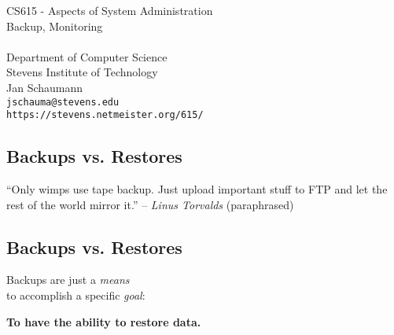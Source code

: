 \documentclass[xga]{xdvislides}
\begin{document}
\setfontphv

\lhead{\slidetitle}                               %
\cfoot{\relax}                               %
\rfoot{\Gray{\today}}

\newcommand{\smallish}{\fontsize{16}{16}\selectfont}

\vspace*{\fill}
\begin{center}
	\Hugesize
		CS615 - Aspects of System Administration\\ [1em]
		Backup, Monitoring\\ [1em]
	\hspace*{5mm}\blueline\\ [1em]
	\Normalsize
		Department of Computer Science\\
		Stevens Institute of Technology\\
		Jan Schaumann\\
		\verb+jschauma@stevens.edu+\\
		\verb+https://stevens.netmeister.org/615/+
\end{center}
\vspace*{\fill}

\subsection{Backups vs. Restores}

\vspace*{\fill}
\Huge
\begin{center}
``Only wimps use tape backup.  Just upload important
stuff to FTP and let the rest of the world mirror
it.'' -- {\em Linus Torvalds} (paraphrased)
\end{center}
\Normalsize
\vspace*{\fill}

\subsection{Backups vs. Restores}
\Huge
\begin{center}

Backups are just a {\em means} \\
to accomplish a specific {\em goal}: \\

\vspace{.5in}

{\bf To have the ability to restore data.}
\end{center}
\Normalsize
\end{document}
